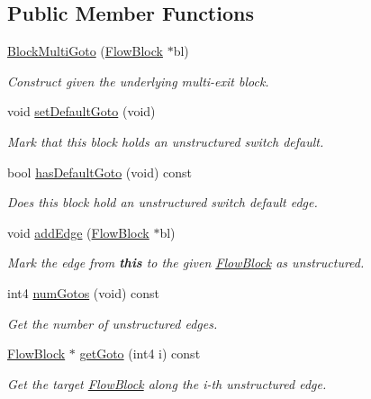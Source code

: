 \subsection*{Public Member Functions}
\begin{DoxyCompactItemize}
\item 
\mbox{\hyperlink{class_block_multi_goto_a16e2f39f527394fbdf5379813b8beb6f}{Block\+Multi\+Goto}} (\mbox{\hyperlink{class_flow_block}{Flow\+Block}} $\ast$bl)
\begin{DoxyCompactList}\small\item\em Construct given the underlying multi-\/exit block. \end{DoxyCompactList}\item 
void \mbox{\hyperlink{class_block_multi_goto_adda142d9e4fa3d02adfbf887cc4c17f6}{set\+Default\+Goto}} (void)
\begin{DoxyCompactList}\small\item\em Mark that this block holds an unstructured switch default. \end{DoxyCompactList}\item 
bool \mbox{\hyperlink{class_block_multi_goto_a4b82d9a526047c2af81c24884bf2db24}{has\+Default\+Goto}} (void) const
\begin{DoxyCompactList}\small\item\em Does this block hold an unstructured switch default edge. \end{DoxyCompactList}\item 
void \mbox{\hyperlink{class_block_multi_goto_ae44f2a0b73e918aa46dbae92d4eb67de}{add\+Edge}} (\mbox{\hyperlink{class_flow_block}{Flow\+Block}} $\ast$bl)
\begin{DoxyCompactList}\small\item\em Mark the edge from {\bfseries{this}} to the given \mbox{\hyperlink{class_flow_block}{Flow\+Block}} as unstructured. \end{DoxyCompactList}\item 
int4 \mbox{\hyperlink{class_block_multi_goto_a8a98ae30b486ab27e453e78c37a194c9}{num\+Gotos}} (void) const
\begin{DoxyCompactList}\small\item\em Get the number of unstructured edges. \end{DoxyCompactList}\item 
\mbox{\hyperlink{class_flow_block}{Flow\+Block}} $\ast$ \mbox{\hyperlink{class_block_multi_goto_ae4bd0a4f2da98b84b96b1a9ec97b46e3}{get\+Goto}} (int4 i) const
\begin{DoxyCompactList}\small\item\em Get the target \mbox{\hyperlink{class_flow_block}{Flow\+Block}} along the i-\/th unstructured edge. \end{DoxyCompactList}\item 

\end{DoxyCompactItemize}
